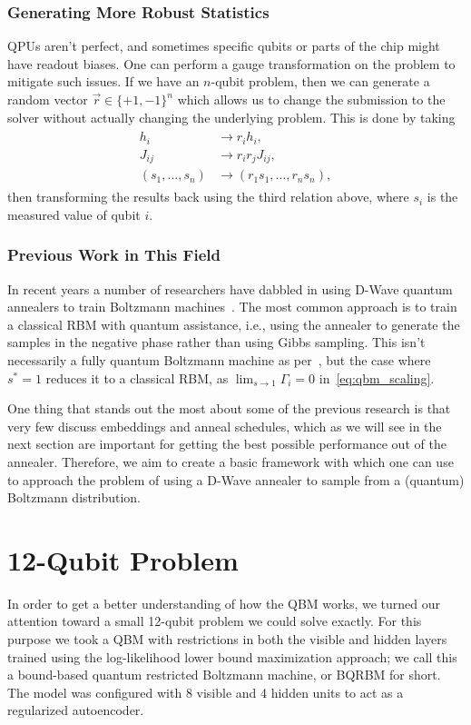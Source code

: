 \subsubsection{Generating More Robust Statistics}\label{sec:gauge}
QPUs aren't perfect, and sometimes specific qubits or parts of the chip might have readout biases.
One can perform a gauge transformation on the problem to mitigate such issues.
If we have an \( n \)-qubit problem, then we can generate a random vector \( \vec{r} \in \{+1, -1\}^n \) which allows us to change the submission to the solver without actually changing the underlying problem.
This is done by taking
\begin{align}
\begin{split}
    h_i
        &\rightarrow r_i h_i, \\
    J_{ij}
        &\rightarrow r_i r_j J_{ij}, \\
    (s_1, \dots, s_n)
        &\rightarrow (r_1 s_1, \dots, r_n s_n),
\end{split}
\end{align}
then transforming the results back using the third relation above, where \( s_i \) is the measured value of qubit \( i \).

\subsubsection{Previous Work in This Field}
In recent years a number of researchers have dabbled in using D-Wave quantum annealers to train Boltzmann machines~\cite{adachi_2015,benedetti_2016,anschuetz_2019,wiebe_2019,rocutto_2020,dixit_2021,ilmo_2021,wilson_2021,xu_2021}.
The most common approach is to train a classical RBM with quantum assistance, i.e., using the annealer to generate the samples in the negative phase rather than using Gibbs sampling.
This isn't necessarily a fully quantum Boltzmann machine as per~\cite{amin_2018}, but the case where \( s^* = 1 \) reduces it to a classical RBM, as \( \lim_{s\rightarrow 1} \Gamma_i = 0 \) in~\cref{eq:qbm_scaling}.

One thing that stands out the most about some of the previous research is that very few discuss embeddings and anneal schedules, which as we will see in the next section are important for getting the best possible performance out of the annealer.
Therefore, we aim to create a basic framework with which one can use to approach the problem of using a D-Wave annealer to sample from a (quantum) Boltzmann distribution.

\section{12-Qubit Problem}\label{sec:qbm_12_qubit_problem}
In order to get a better understanding of how the QBM works, we turned our attention toward a small 12-qubit problem we could solve exactly.
For this purpose we took a QBM with restrictions in both the visible and hidden layers trained using the log-likelihood lower bound maximization approach; we call this a bound-based quantum restricted Boltzmann machine, or BQRBM for short.
The model was configured with 8 visible and 4 hidden units to act as a regularized autoencoder.

